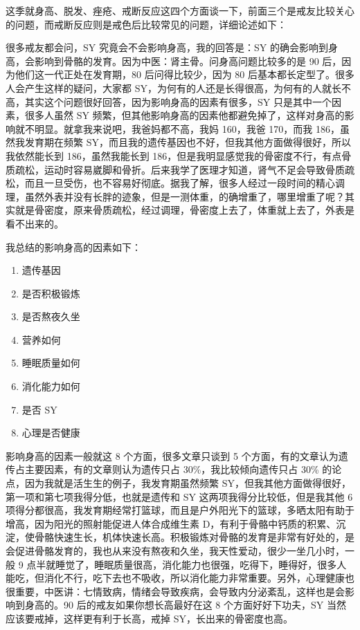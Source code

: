 \documentclass[fontset=founder]{ctexart}
\begin{document}
这季就身高、脱发、痤疮、戒断反应这四个方面谈一下，前面三个是戒友比较关心的问题，而戒断反应则是戒色后比较常见的问题，详细论述如下：

很多戒友都会问，SY 究竟会不会影响身高，我的回答是：SY 的确会影响到身高，会影响到骨骼的发育。因为中医：肾主骨。问身高问题比较多的是 90 后，因为他们这一代正处在发育期，80 后问得比较少，因为 80 后基本都长定型了。很多人会产生这样的疑问，大家都 SY，为何有的人还是长得很高，为何有的人就长不高，其实这个问题很好回答，因为影响身高的因素有很多，SY 只是其中一个因素，很多人虽然 SY 频繁，但其他影响身高的因素他都避免掉了，这样对身高的影响就不明显。就拿我来说吧，我爸妈都不高，我妈 160，我爸 170，而我 186，虽然我发育期在频繁 SY，而且我的遗传基因也不好，但我其他方面做得很好，所以我依然能长到 186，虽然我能长到 186，但是我明显感觉我的骨密度不行，有点骨质疏松，运动时容易崴脚和骨折。后来我学了医理才知道，肾气不足会导致骨质疏松，而且一旦受伤，也不容易好彻底。据我了解，很多人经过一段时间的精心调理，虽然外表并没有长胖的迹象，但是一测体重，的确增重了，哪里增重了呢？其实就是骨密度，原来骨质疏松，经过调理，骨密度上去了，体重就上去了，外表是看不出来的。

我总结的影响身高的因素如下：

\begin{enumerate}
    \item 遗传基因
    \item 是否积极锻炼
    \item 是否熬夜久坐
    \item 营养如何
    \item 睡眠质量如何
    \item 消化能力如何
    \item 是否 SY
    \item 心理是否健康
\end{enumerate}

影响身高的因素一般就这 8 个方面，很多文章只谈到 5 个方面，有的文章认为遗传占主要因素，有的文章则认为遗传只占 30\%，我比较倾向遗传只占 30\% 的论点，因为我就是活生生的例子，我发育期虽然频繁 SY，但我其他方面做得很好，第一项和第七项我得分低，也就是遗传和 SY 这两项我得分比较低，但是我其他 6 项得分都很高，我发育期经常打篮球，而且是户外阳光下的篮球，多晒太阳有助于增高，因为阳光的照射能促进人体合成维生素 D，有利于骨骼中钙质的积累、沉淀，使骨骼快速生长，机体快速长高。积极锻炼对骨骼的发育是非常有好处的，是会促进骨骼发育的，我也从来没有熬夜和久坐，我天性爱动，很少一坐几小时，一般 9 点半就睡觉了，睡眠质量很高，消化能力也很强，吃得下，睡得好，很多人能吃，但消化不行，吃下去也不吸收，所以消化能力非常重要。另外，心理健康也很重要，中医讲：七情致病，情绪会导致疾病，会导致内分泌紊乱，这样也是会影响到身高的。90 后的戒友如果你想长高最好在这 8 个方面好好下功夫，SY 当然应该要戒掉，这样更有利于长高，戒掉 SY，长出来的骨密度也高。
\end{document}

